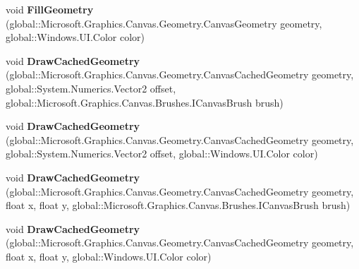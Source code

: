 \begin{DoxyCompactItemize}
\item 
\mbox{\label{class_microsoft_1_1_graphics_1_1_canvas_1_1_canvas_drawing_session_aa4597681767e7ab7be35a7aa024588d0}} 
void {\bfseries Fill\+Geometry} (global\+::\+Microsoft.\+Graphics.\+Canvas.\+Geometry.\+Canvas\+Geometry geometry, global\+::\+Windows.\+U\+I.\+Color color)
\item 
\mbox{\label{class_microsoft_1_1_graphics_1_1_canvas_1_1_canvas_drawing_session_a67a01983413bc50a974695a718055382}} 
void {\bfseries Draw\+Cached\+Geometry} (global\+::\+Microsoft.\+Graphics.\+Canvas.\+Geometry.\+Canvas\+Cached\+Geometry geometry, global\+::\+System.\+Numerics.\+Vector2 offset, global\+::\+Microsoft.\+Graphics.\+Canvas.\+Brushes.\+I\+Canvas\+Brush brush)
\item 
\mbox{\label{class_microsoft_1_1_graphics_1_1_canvas_1_1_canvas_drawing_session_a5450791ed43c8444b41ae10cc67e2267}} 
void {\bfseries Draw\+Cached\+Geometry} (global\+::\+Microsoft.\+Graphics.\+Canvas.\+Geometry.\+Canvas\+Cached\+Geometry geometry, global\+::\+System.\+Numerics.\+Vector2 offset, global\+::\+Windows.\+U\+I.\+Color color)
\item 
\mbox{\label{class_microsoft_1_1_graphics_1_1_canvas_1_1_canvas_drawing_session_a84ab048f076053f05d0006f94fc6cce5}} 
void {\bfseries Draw\+Cached\+Geometry} (global\+::\+Microsoft.\+Graphics.\+Canvas.\+Geometry.\+Canvas\+Cached\+Geometry geometry, float x, float y, global\+::\+Microsoft.\+Graphics.\+Canvas.\+Brushes.\+I\+Canvas\+Brush brush)
\item 
\mbox{\label{class_microsoft_1_1_graphics_1_1_canvas_1_1_canvas_drawing_session_ac63a9ef703b14a5934497fc8036a2a45}} 
void {\bfseries Draw\+Cached\+Geometry} (global\+::\+Microsoft.\+Graphics.\+Canvas.\+Geometry.\+Canvas\+Cached\+Geometry geometry, float x, float y, global\+::\+Windows.\+U\+I.\+Color color)
\item 
\mbox{\label{class_microsoft_1_1_graphics_1_1_canvas_1_1_canvas_drawing_session_a48198d4418b5ee30d6e0d16226f8ce9e}} 

\end{DoxyCompactItemize}
